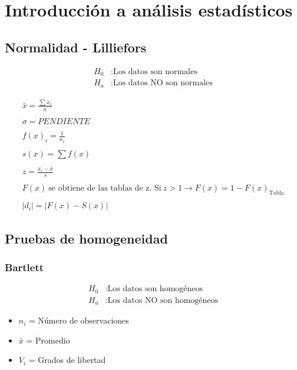 \documentclass{AsignaturaResumen}
\begin{document}
    \dominitoc
    \faketableofcontents
    \chapter{Introducción a análisis estadísticos}
\fi

\section{Normalidad - Lilliefors}

\begin{align*}
    H_{0} &: \text{Los datos son normales}
    \\
    H_{a} &: \text{Los datos NO son normales}
\end{align*}

\begin{gather*}
    \bar{x} = \frac{\sum{x_{i}}}{n}
    \\\\
    \sigma = PENDIENTE
    \\\\
    f(x)_{i} = \frac{1}{n_{i}}
    \\\\
    s(x) = \sum{f(x)}
    \\\\
    z = \frac{x_{i} - \bar{x}}{s}
    \\\\
    F(x) \ \text{se obtiene de las tablas de z. Si} \ z > 1 \longrightarrow F(x) = 1 - F(x)_{\text{Tabla}}
    \\\\
    \lvert d_{i} \lvert = \lvert F(x) - S(x) \lvert
\end{gather*}


\section{Pruebas de homogeneidad}

\subsection{Bartlett}
\begin{align*}
    H_{0} &: \text{Los datos son homogéneos}
    \\
    H_{a} &: \text{Los datos NO son homogéneos}
\end{align*}

\begin{itemize}
    \item $n_{i}$ = Número de observaciones
    \item $\bar{x}$ = Promedio
    \item $V_{i}$ = Grados de libertad
\end{itemize}
\end{document}
